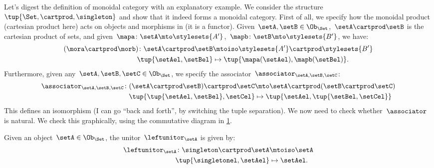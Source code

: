 \begin{example}
    Let's digest the definition of monoidal category with an explanatory example.
    We consider the structure~$\tup{\Set,\cartprod,\singleton}$ and show that it indeed forms a monoidal category.
    First of all, we specify how the monoidal product (cartesian product here) acts on objects and morphisms in \Set (it is a functor).
    Given~$\setA,\setB\in \Ob_{\Set}$,~$\setA\cartprod \setB$ is the cartesian product of sets, and given~$\mapa\colon \setA\mto \stylesets{A'}$,~$\mapb\colon \setB\mto \stylesets{B'}$, we have:
    \begin{equation*}
        \label{eq:set_mon_prod_2}
        \begin{aligned}
            (\mora \cartprod \morb)
            \colon \setA\cartprod \setB & \mtoiso \stylesets{A'}\cartprod \stylesets{B'} \\
            \tup{\setAel,\setBel}       & \mapsto \tup{\mapa(\setAel),\mapb(\setBel)}.
        \end{aligned}
    \end{equation*}
    Furthermore, given any~$\setA,\setB,\setC\in \Ob_{\Set}$, we specify the associator~$\associator_{\setA,\setB,\setC}$:
    \begin{equation*}
        \label{eq:set_mon_prod_3}
        \begin{aligned}
            \associator_{\setA,\setB,\setC}\colon (\setA\cartprod \setB)\cartprod \setC & \mto \setA\cartprod (\setB\cartprod \setC)  \\
            \tup{\tup{\setAel,\setBel},\setCel}                                         & \mapsto \tup{\setAel,\tup{\setBel,\setCel}}
        \end{aligned}
    \end{equation*}
    This defines an isomorphism (I can go ``back and forth'', by switching the tuple separation).
    We now need to check whether~$\associator$ is natural.
    We check this graphically, using the commutative diagram in \cref{fig:monoidal_set_ass_nat}.

    \begin{figure}[h!]
        \centering
        \caption{}
        \label{fig:monoidal_set_ass_nat}
    \end{figure}

    Given an object~$\setA\in \Ob_\Set$, the unitor~$\leftunitor_\setA$ is given by:
    \begin{equation*}
        \label{eq:set_mon_prod_4}
        \begin{aligned}
            \leftunitor_\setA\colon \singleton \cartprod \setA & \mtoiso \setA    \\
            \tup{\singletonel,\setAel}                         & \mapsto \setAel.
        \end{aligned}
    \end{equation*}


\end{example}
